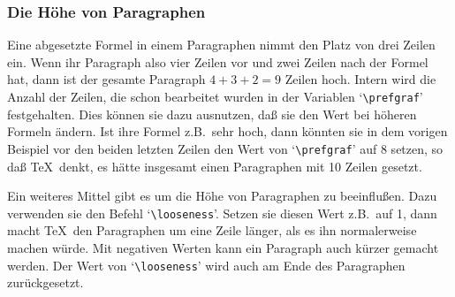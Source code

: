 \subsubsection{Die H\"ohe von Paragraphen}
Eine 
abgesetzte Formel in einem Paragraphen nimmt den Platz von drei
Zeilen ein. Wenn ihr Paragraph also vier Zeilen vor und zwei Zeilen
nach der Formel hat, dann ist der gesamte Paragraph $4+3+2=9$ Zeilen
hoch. Intern wird die Anzahl der Zeilen, die schon bearbeitet wurden
in der Variablen 
`\verb|\prefgraf|' festgehalten. Dies k\"onnen sie dazu
ausnutzen, da\ss{} sie den Wert bei h\"oheren Formeln \"andern. Ist ihre
Formel z.B.\ sehr hoch, dann k\"onnten sie in dem vorigen Beispiel vor
den beiden letzten Zeilen den Wert von `\verb|\prefgraf|' auf 8
setzen, so da\ss{} \TeX\ denkt, es h\"atte insgesamt einen Paragraphen mit
10 Zeilen gesetzt.

Ein weiteres Mittel gibt es um die H\"ohe von Paragraphen zu
beeinflu\ss{}en. Dazu verwenden sie den Befehl
`\verb|\looseness|'. Setzen sie diesen Wert
z.B.\ auf 1, dann macht \TeX\ den Paragraphen um eine Zeile l\"anger,
als es ihn normalerweise machen w\"urde. Mit negativen Werten kann ein
Paragraph auch k\"urzer gemacht werden. Der Wert von `\verb|\looseness|'
wird auch am Ende des Paragraphen zur\"uckgesetzt.

